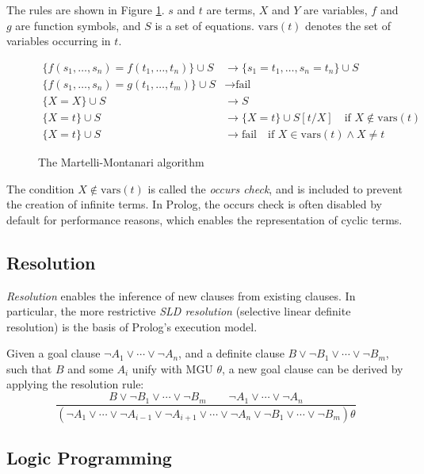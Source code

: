 The rules are shown in Figure \ref{fig:martelli-montanari}. $s$ and $t$ are terms, $X$ and $Y$ are variables, $f$ and $g$ are function symbols, and $S$ is a set of equations. $\text{vars}(t)$ denotes the set of variables occurring in $t$.

\begin{figure}[H]
\begin{align*}
\{f(s_1, \ldots, s_n) = f(t_1, \ldots, t_n)\} \cup S &\rightarrow \{s_1 = t_1, \ldots, s_n = t_n\} \cup S \\
\{f(s_1, \ldots, s_n) = g(t_1, \ldots, t_m)\} \cup S &\rightarrow \text{fail} \\
\{X = X\} \cup S &\rightarrow S \\
\{X = t\} \cup S &\rightarrow \{X = t\} \cup S[t/X] \quad \text{if } X \notin \text{vars}(t) \\
\{X = t\} \cup S &\rightarrow \text{fail} \quad \text{if } X \in \text{vars}(t) \land X \neq t
\end{align*}
\caption{The Martelli-Montanari algorithm}
\label{fig:martelli-montanari}
\end{figure}

The condition $X \notin \text{vars}(t)$ is called the \emph{occurs check}, and is included to prevent the creation of infinite terms. In Prolog, the occurs check is often disabled by default for performance reasons, which enables the representation of cyclic terms.

\subsection{Resolution}

\emph{Resolution} enables the inference of new clauses from existing clauses. In particular, the more restrictive \emph{SLD resolution} (selective linear definite resolution) is the basis of Prolog's execution model.

Given a goal clause $\neg A_1 \lor \cdots \lor \neg A_n$, and a definite clause $B \lor \neg B_1 \lor \cdots \lor \neg B_m$, such that $B$ and some $A_i$ unify with MGU $\theta$, a new goal clause can be derived by applying the resolution rule:
$$
\frac{B \lor \neg B_1 \lor \cdots \lor \neg B_m \qquad \neg A_1 \lor \cdots \lor \neg A_n}{(\neg A_1 \lor \cdots \lor \neg A_{i-1} \lor \neg A_{i+1} \lor \cdots \lor \neg A_n \lor \neg B_1 \lor \cdots \lor \neg B_m)\theta}
$$

\subsection{Logic Programming}

